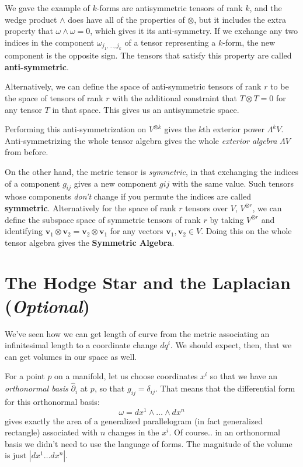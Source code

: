 \documentclass[../master.tex]{subfiles}
\begin{document}
	We gave the example of $k$-forms are antisymmetric tensors of rank $k$, and the wedge product $\wedge$ does have all of the properties of $\otimes$, but it includes the extra property that $\omega \wedge \omega = 0$, which gives it its anti-symmetry. If we exchange any two indices in the component $\omega_{j_1, \dots, j_k}$ of a tensor representing a $k$-form, the new component is the opposite sign. The tensors that satisfy this property are called \textbf{anti-symmetric}. 
	
	Alternatively, we can define the space of anti-symmetric tensors of rank $r$ to be the space of tensors of rank $r$ with the additional constraint that $T \otimes T = 0$ for any tensor $T$ in that space. This gives us an antisymmetric space. 
	
	Performing this anti-symmetrization on $V^{\otimes k}$ gives the $k$th exterior power $\Lambda^k V$. Anti-symmetrizing the whole tensor algebra gives the whole \emph{exterior algebra} $\Lambda V$ from before. 
	
	On the other hand, the metric tensor is \emph{symmetric}, in that exchanging the indices of a component $g_{ij}$ gives a new component $g{ij}$ with the same value. Such tensors whose components \emph{don't} change if you permute the indices are called \textbf{symmetric}. Alternatively for the space of rank $r$ tensors over $V$, $V^{\otimes r}$, we can define the subspace space of symmetric tensors of rank $r$ by taking $V^{\otimes r}$ and identifying $\mathbf v_1 \otimes \mathbf v_2 = \mathbf v_2 \otimes \mathbf v_1$ for any vectors $\mathbf v_1, \mathbf v_2 \in V$. Doing this on the whole tensor algebra gives the \textbf{Symmetric Algebra}.
	

	\section{The Hodge Star and the Laplacian (\emph{Optional})} %
	\label{sec:the_hodge_star_and_the_laplacian}
	
	We've seen how we can get length of curve from the metric associating an infinitesimal length to a coordinate change $dq^i$. We should expect, then, that we can get volumes in our space as well.  
	
	For a point $p$ on a manifold, let us choose coordinates $x^i$ so that we have an \emph{orthonormal basis} $\hat \partial_i$ at $p$, so that $g_{ij} = \delta_{ij}$. That means that the differential form for this orthonormal basis:
	\begin{equation}
		\omega = dx^1 \wedge \dots \wedge dx^n
	\end{equation}
	gives exactly the area of a generalized parallelogram (in fact generalized rectangle) associated with $n$ changes in the $x^i$. Of course.. in an orthonormal basis we didn't need to use the language of forms. The magnitude of the volume is just $|dx^1 \dots dx^n|$.
	
\end{document}

